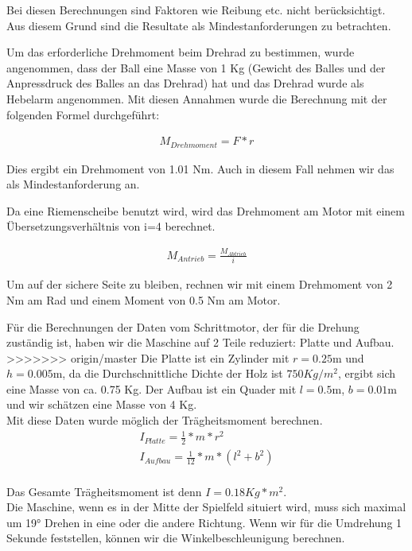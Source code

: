 Bei diesen Berechnungen sind Faktoren wie Reibung etc. nicht berücksichtigt. Aus diesem Grund sind die Resultate als Mindestanforderungen zu betrachten.

Um das erforderliche Drehmoment beim Drehrad zu bestimmen, wurde angenommen, dass der Ball eine Masse von 1 Kg (Gewicht des Balles und der Anpressdruck des Balles an das Drehrad) hat und das Drehrad wurde als Hebelarm angenommen. Mit diesen Annahmen wurde die Berechnung mit der folgenden Formel durchgeführt:

\begin{gather}
	M_{Drehmoment}=F*r
\end{gather}

Dies ergibt ein Drehmoment von 1.01 Nm. Auch in diesem Fall nehmen wir das als Mindestanforderung an.

Da eine Riemenscheibe benutzt wird, wird das Drehmoment am Motor mit einem Übersetzungsverhältnis von i=4 berechnet.

\begin{gather}
	M_{Antrieb}=\frac{M_{Abtrieb}}{i}
\end{gather}

Um auf der sichere Seite zu bleiben, rechnen wir mit einem Drehmoment von 2 Nm am Rad und einem Moment von 0.5 Nm am Motor.

Für die Berechnungen der Daten vom Schrittmotor, der für die Drehung zuständig ist, haben wir die Maschine auf 2 Teile reduziert: Platte und Aufbau.
>>>>>>> origin/master
Die Platte ist ein Zylinder mit $r=0.25$m und $h=0.005$m, da die Durchschnittliche Dichte der Holz ist $750 Kg/m^2$, ergibt sich eine Masse von ca. 0.75 Kg.
Der Aufbau ist ein Quader mit $l=0.5$m, $b=0.01$m und wir schätzen eine Masse von 4 Kg.\\
Mit diese Daten wurde möglich der Trägheitsmoment berechnen.\\

\begin{gather}
	I_{Platte}=\frac{1}{2}*m*r^2 \\
	I_{Aufbau}=\frac{1}{12}*m*(l^2+b^2)
\end{gather}\\

Das Gesamte Trägheitsmoment ist denn $I=0.18 Kg*m^2$.\\
Die Maschine, wenn es in der Mitte der Spielfeld situiert wird, muss sich maximal um 19° Drehen in eine oder die andere Richtung. Wenn wir für die Umdrehung 1 Sekunde feststellen, können wir die Winkelbeschleunigung berechnen. \\


